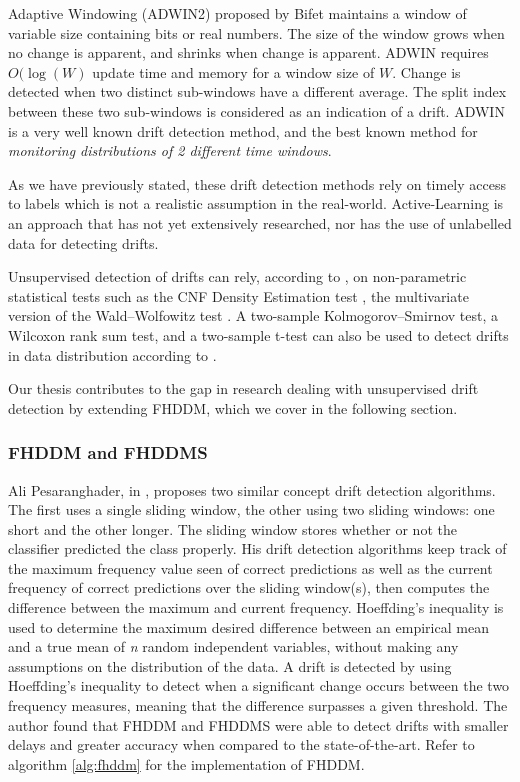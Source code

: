 Adaptive Windowing (ADWIN2) proposed by Bifet\cite{bifet2007learning} maintains a window of variable size containing bits or real numbers. The size of the window grows when no change is apparent, and shrinks when change is apparent. ADWIN requires $O(\log(W)$ update time and memory for a window size of $W$. Change is detected when two distinct sub-windows have a different average. The split index between these two sub-windows is considered as an indication of a drift. ADWIN is a very well known drift detection method, and the best known method for \textit{monitoring distributions of 2 different time windows}.

As we have previously stated, these drift detection methods rely on timely access to labels which is not a realistic assumption in the real-world.  Active-Learning is an approach that has not yet extensively researched, nor has the use of unlabelled data for detecting drifts.

Unsupervised detection of drifts can rely, according to \cite{sobolewski2013concept}, on non-parametric statistical tests such as the CNF Density Estimation test \cite{dries2009adaptive}, the multivariate version of the Wald–Wolfowitz test \cite{friedman1979multivariate}.
A two-sample Kolmogorov–Smirnov test, a Wilcoxon rank sum test, and a two-sample t-test can also be used to detect drifts in data distribution according to \cite{sobolewski2013concept, sheskin2003handbook}.

Our thesis contributes to the gap in research dealing with unsupervised drift detection by extending FHDDM, which we cover in the following section.

\subsubsection{FHDDM and FHDDMS\label{section:fhddm/s}}
Ali Pesaranghader, in \parencite{pesaranghader2018reservoirthesis,pesaranghader2018reservoir, pesaranghader2016fast}, proposes two similar concept drift detection algorithms. The first uses a single sliding window, the other using two sliding windows: one short and the other longer. The sliding window stores whether or not the classifier predicted the class properly. His drift detection algorithms keep track of the maximum frequency value seen of correct predictions as well as the current frequency of correct predictions over the sliding window(s), then computes the difference between the maximum and current frequency. Hoeffding's inequality is used to determine the maximum desired difference between an empirical mean and a true mean of \textit{n} random independent variables, without making any assumptions on the distribution of the data. A drift is detected by using Hoeffding's inequality to detect when a significant change occurs between the two frequency measures, meaning that the difference surpasses a given threshold. The author found that FHDDM and FHDDMS were able to detect drifts with smaller delays and greater accuracy when compared to the state-of-the-art. Refer to algorithm \ref{alg:fhddm} for the implementation of FHDDM.

